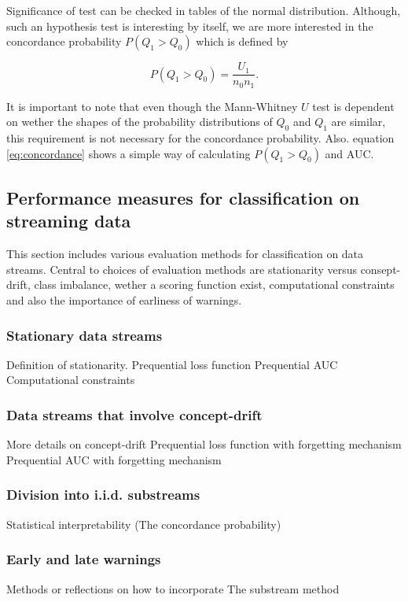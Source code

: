 Significance of test can be checked in tables of the normal distribution.  Although, such an hypothesis test is interesting by itself, we are more interested in the concordance probability $P(Q_1 > Q_0)$ which is defined by

\begin{equation}
\label{eq:concordance}
P(Q_1 > Q_0) = \frac{U_1}{n_0n_1}.
\end{equation}

It is important to note that even though the Mann-Whitney $U$ test is dependent on wether the shapes of the probability distributions of $Q_0$ and $Q_1$ are similar, this requirement is not necessary for the concordance probability.  Also. equation \eqref{eq:concordance} shows a simple way of calculating $P(Q_1 > Q_0)$ and AUC.

\subsection{Performance measures for classification on streaming data}
\label{sec:stream}

This section includes various evaluation methods for classification on data streams.  Central to choices of evaluation methods are stationarity versus consept-drift, class imbalance, wether a scoring function exist, computational constraints and also the importance of earliness of warnings.

\subsubsection{Stationary data streams}
Definition of stationarity.
Prequential loss function
Prequential AUC
Computational constraints
\subsubsection{Data streams that involve concept-drift}
More details on concept-drift
Prequential loss function with forgetting mechanism
Prequential AUC with forgetting mechanism
\subsubsection{Division into i.i.d. substreams} 
Statistical interpretability (The concordance probability)
\subsubsection{Early and late warnings}
Methods or reflections on how to incorporate
The substream method


